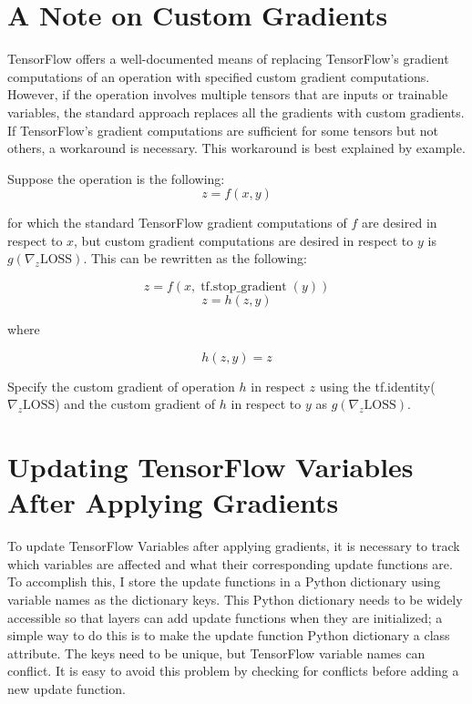\section{A Note on Custom Gradients}
TensorFlow offers a well-documented means of replacing TensorFlow's gradient computations of an operation with specified custom gradient computations. However, if the operation involves multiple tensors that are inputs or trainable variables, the standard approach replaces all the gradients with custom gradients. If TensorFlow's gradient computations are sufficient for some tensors but not others, a workaround is necessary. This workaround is best explained by example.

Suppose the operation is the following:
\begin{equation}
z = f(x,y)
\end{equation}

for which the standard TensorFlow gradient computations of $f$ are desired in respect to $x$, but custom gradient computations are desired in respect to $y$ is $g(\nabla_z \text{LOSS})$. This can be rewritten as the following:

\begin{equation}
z = f(x,\operatorname{tf.stop\_gradient}(y))
\end{equation}
\begin{equation}
z = h(z,y)
\end{equation}

where

\begin{equation}
h(z,y) = z
\end{equation}

Specify the custom gradient of operation $h$ in respect $z$ using the tf.identity($\nabla_z \text{LOSS}$) and the custom gradient of $h$ in respect to $y$ as $g(\nabla_z \text{LOSS})$. 

\section{Updating TensorFlow Variables After Applying Gradients}
To update TensorFlow Variables after applying gradients, it is necessary to track which variables are affected and what their corresponding update functions are. To accomplish this, I store the update functions in a Python dictionary using variable names as the dictionary keys. This Python dictionary needs to be widely accessible so that layers can add update functions when they are initialized; a simple way to do this is to make the update function Python dictionary a class attribute. The keys need to be unique, but TensorFlow variable names can conflict. It is easy to avoid this problem by checking for conflicts before adding a new update function.


